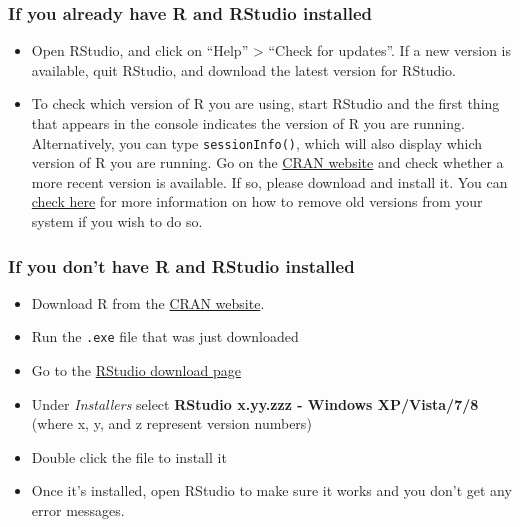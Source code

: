 \documentclass[
]{book}
\providecommand{\tightlist}{%
  \setlength{\itemsep}{0pt}\setlength{\parskip}{0pt}}
\begin{document}
\hypertarget{if-you-already-have-r-and-rstudio-installed-1}{%
\subsubsection*{If you already have R and RStudio installed}\label{if-you-already-have-r-and-rstudio-installed-1}}

\begin{itemize}
\tightlist
\item
  Open RStudio, and click on ``Help'' \textgreater{} ``Check for updates''. If a new version is
  available, quit RStudio, and download the latest version for RStudio.
\item
  To check which version of R you are using, start RStudio and the first thing
  that appears in the console indicates the version of R you are
  running. Alternatively, you can type \texttt{sessionInfo()}, which will also display
  which version of R you are running. Go on
  the \href{https://cran.r-project.org/bin/windows/base/}{CRAN website} and check
  whether a more recent version is available. If so, please download and install
  it. You can \href{https://cran.r-project.org/bin/windows/base/rw-FAQ.html\#How-do-I-UNinstall-R_003f}{check here} for
  more information on how to remove old versions from your system if you wish to do so.
\end{itemize}

\hypertarget{if-you-dont-have-r-and-rstudio-installed-1}{%
\subsubsection*{If you don't have R and RStudio installed}\label{if-you-dont-have-r-and-rstudio-installed-1}}

\begin{itemize}
\tightlist
\item
  Download R from
  the \href{http://cran.r-project.org/bin/windows/base/release.htm}{CRAN website}.
\item
  Run the \texttt{.exe} file that was just downloaded
\item
  Go to the \href{https://www.rstudio.com/products/rstudio/download/\#download}{RStudio download page}
\item
  Under \emph{Installers} select \textbf{RStudio x.yy.zzz - Windows
  XP/Vista/7/8} (where x, y, and z represent version numbers)
\item
  Double click the file to install it
\item
  Once it's installed, open RStudio to make sure it works and you don't get any
  error messages.
\end{itemize}
\end{document}
